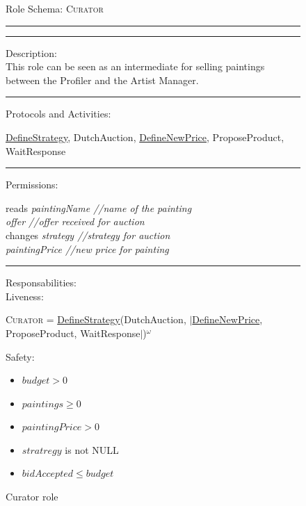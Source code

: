 \documentclass[a4paper,11pt]{report}
\begin{document}
  
  \begin{figure}[ht!]
    \begin{mdframed}
      Role Schema: \textsc{Curator} \\ \hrule \vspace{2pt} \hrule \vspace{10pt}
      Description:\\
      This role can be seen as an intermediate for selling paintings between the Profiler
      and the Artist Manager.
      \\ \hrule \vspace{10pt}
      Protocols and Activities:
      \vspace{-10pt}
      \begin{flushleft}
       \underline{DefineStrategy}, DutchAuction,
       \underline{DefineNewPrice},
       ProposeProduct, WaitResponse
      \end{flushleft}
      \hrule \vspace{10pt}
      Permissions:\\
      \vspace{-10pt}
      \begin{center}
       reads \textit{paintingName //name of the painting}\\
	    \textit{offer //offer received for auction}\\
       changes \textit{strategy //strategy for auction}\\
       \textit{paintingPrice //new price for painting}
      \end{center}
      \hrule \vspace{10pt}
      Responsabilities:\\
      Liveness:
      \vspace{-10pt}
      \begin{flushleft}
      \small\textsc{Curator} = \underline{DefineStrategy}(DutchAuction, $\mid$\underline{DefineNewPrice},
       ProposeProduct, WaitResponse$\mid$)$^\omega$
      \end{flushleft}
      Safety:
      \vspace{-10pt}
      \begin{itemize}
      \itemsep0em
      \item $budget > 0$
       \item $paintings \geq 0$
       \item $paintingPrice > 0$
       \item $stratregy$ is not NULL
       \item $bidAccepted \leq budget$
      \end{itemize}
    \end{mdframed}
  \caption{Curator role}
  \label{figure:role_curator}
  \end{figure}
  
\end{document}
